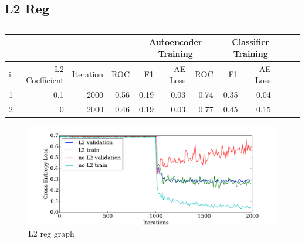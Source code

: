     \subsection{L2 Reg}
      \begin{table}[!h] {\small \centering
      \begin{tabular}{lrrrrrrrrrrr}
        &&& &  \multicolumn{3}{|c|}{Autoencoder Training} &  \multicolumn{3}{c|}{Classifier Training}    \\
      \hline
       i &   L2 Coefficient &   Iteration &   ROC&F1&AE Loss & ROC & F1 & AE Loss \\
      \hline
       1 &       0.1 & 2000 &    0.56 &   0.19 &     0.03 &    0.74 &   0.35 &     0.04\\
       2 &       0   & 2000 &    0.46 &   0.19 &     0.03 &    0.77 &   0.45 &     0.15\\
      \hline
      \end{tabular}\caption{} \label{tab:pseaafasfrch}} \end{table}

      \begin{figure}[!h]
      \centering
      \includegraphics[width =0.8\hsize]{figures/l2.pdf}
      \caption{L2 reg graph}
      \label{fig:alpha_functions}
      \end{figure}

    \newpage

